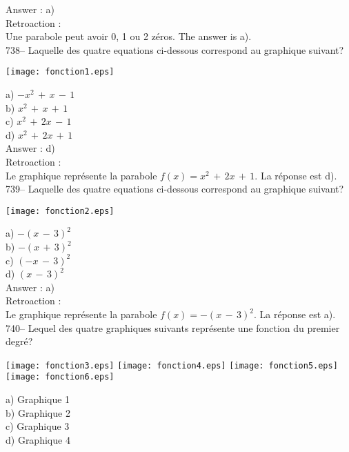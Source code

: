 ﻿\documentclass[letterpaper, 12pt]{article}
\begin{document}
Answer : a)\\

Retroaction : \\
Une parabole peut avoir 0, 1 ou 2 z\'eros.  The answer is a).\\

738-- Laquelle des quatre equations ci-dessous correspond au graphique
suivant?\\
    \begin{center}
    \texttt{[image: fonction1.eps]}
    \end{center}

a) $-x^{2}\,+\,x\,-\,1$\\
b) $x^{2}\,+\,x\,+\,1$\\
c) $x^{2}\,+\,2x\,-\,1$\\
d) $x^{2}\,+\,2x\,+\,1$\\

Answer : d)\\

Retroaction : \\
Le graphique repr\'esente la parabole $f(x)=x^{2}\,+\,2x\,+\,1$.  La
r\'eponse est d).\\

739-- Laquelle des quatre equations ci-dessous correspond au graphique
suivant?\\
    \begin{center}
    \texttt{[image: fonction2.eps]}
    \end{center}

a) $-(x\,-\,3)^{2}$\\
b) $-(x\,+\,3)^{2}$\\
c) $(-x\,-\,3)^{2}$\\
d) $(x\,-\,3)^{2}$\\

Answer : a)\\

Retroaction : \\
Le graphique repr\'esente la parabole $f(x)=-(x\,-\,3)^{2}$.  La r\'eponse
est a).  \\

740-- Lequel des quatre graphiques suivants repr\'esente une fonction du
premier degr\'e?\\
    \begin{center}
    \texttt{[image: fonction3.eps]}
\texttt{[image: fonction4.eps]}
\texttt{[image: fonction5.eps]}
\texttt{[image: fonction6.eps]}
    \end{center}
a) Graphique 1\\
b) Graphique 2\\
c) Graphique 3\\
d) Graphique 4\\
\end{document}
